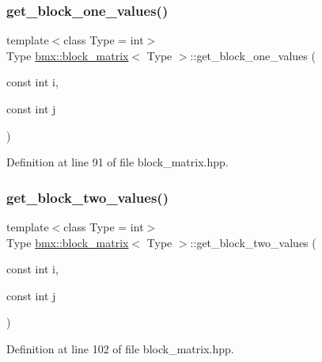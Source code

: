 \subsubsection{\texorpdfstring{get\+\_\+block\+\_\+one\+\_\+values()}{get\_block\_one\_values()}}
{\footnotesize\ttfamily template$<$class Type = int$>$ \\
Type \mbox{\hyperlink{classbmx_1_1block__matrix}{bmx\+::block\+\_\+matrix}}$<$ Type $>$\+::get\+\_\+block\+\_\+one\+\_\+values (\begin{DoxyParamCaption}\item[{const int}]{i,  }\item[{const int}]{j }\end{DoxyParamCaption})\hspace{0.3cm}{\ttfamily [inline]}}



Definition at line 91 of file block\+\_\+matrix.\+hpp.

\mbox{\label{classbmx_1_1block__matrix_a4737a14c292308edbf16d71b3b6240a2}} 
\subsubsection{\texorpdfstring{get\+\_\+block\+\_\+two\+\_\+values()}{get\_block\_two\_values()}}
{\footnotesize\ttfamily template$<$class Type = int$>$ \\
Type \mbox{\hyperlink{classbmx_1_1block__matrix}{bmx\+::block\+\_\+matrix}}$<$ Type $>$\+::get\+\_\+block\+\_\+two\+\_\+values (\begin{DoxyParamCaption}\item[{const int}]{i,  }\item[{const int}]{j }\end{DoxyParamCaption})\hspace{0.3cm}{\ttfamily [inline]}}



Definition at line 102 of file block\+\_\+matrix.\+hpp.

\mbox{\label{classbmx_1_1block__matrix_a5a6c1c462b530c2dcf8bc24a0e6dc85c}} 
